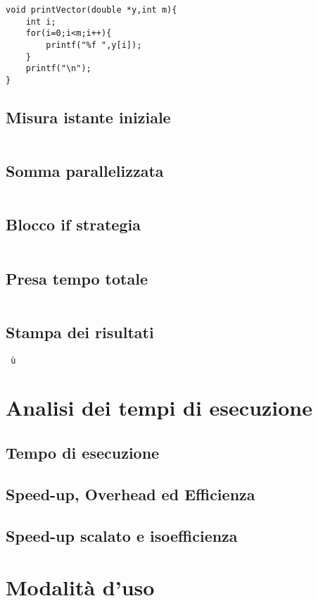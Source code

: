 \documentclass{article}
\begin{document}
\begin{lstlisting}
void printVector(double *y,int m){
    int i;
    for(i=0;i<m;i++){
        printf("%f ",y[i]);
    }
    printf("\n");
}
\end{lstlisting}

\subsection{Misura istante iniziale}

\begin{lstlisting}

\end{lstlisting}

\subsection{Somma parallelizzata}

\begin{lstlisting}

\end{lstlisting}

\subsection{Blocco if strategia}

\begin{lstlisting}

\end{lstlisting}

\subsection{Presa tempo totale}

\begin{lstlisting}

\end{lstlisting}

\subsection{Stampa dei risultati}

\begin{lstlisting}
 ù
\end{lstlisting}


\section{Analisi dei tempi di esecuzione}
\subsection{Tempo di esecuzione}


\subsection{Speed-up, Overhead ed Efficienza}


\subsection{Speed-up scalato e isoefficienza}

\section{Modalità d'uso}
\end{document}
